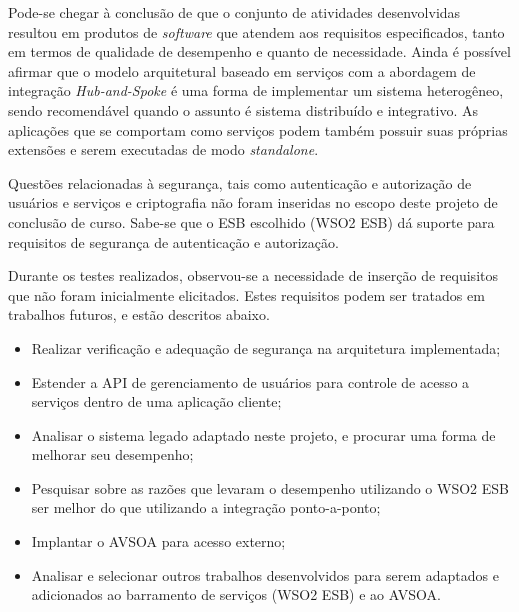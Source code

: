 Pode-se chegar à conclusão de que o conjunto de atividades desenvolvidas resultou em produtos de \textit{software} que atendem aos requisitos especificados, tanto em termos de qualidade de desempenho e quanto de necessidade. Ainda é possível afirmar que o modelo arquitetural baseado em serviços com a abordagem de integração \textit{Hub-and-Spoke} é uma forma de implementar um sistema heterogêneo, sendo recomendável quando o assunto é sistema distribuído e integrativo. As aplicações que se comportam como serviços podem também possuir suas próprias extensões e serem executadas de modo \textit{standalone}.

Questões relacionadas à segurança, tais como autenticação e autorização de usuários e serviços e criptografia não foram inseridas no escopo deste projeto de conclusão de curso. Sabe-se que o ESB escolhido (WSO2 ESB) dá suporte para requisitos de segurança de autenticação e autorização. 

Durante os testes realizados, observou-se a necessidade de inserção de requisitos que não foram inicialmente elicitados. Estes requisitos podem ser tratados em trabalhos futuros, e estão descritos abaixo.

\begin{itemize}
\item Realizar verificação e adequação de segurança na arquitetura implementada;
\item Estender a API de gerenciamento de usuários para controle de acesso a serviços dentro de uma aplicação cliente;
\item Analisar o sistema legado adaptado neste projeto, e procurar uma forma de melhorar seu desempenho;
\item Pesquisar sobre as razões que levaram o desempenho utilizando o WSO2 ESB ser melhor do que utilizando a integração ponto-a-ponto;
\item Implantar o AVSOA para acesso externo;
\item Analisar e selecionar outros trabalhos desenvolvidos para serem adaptados e adicionados ao barramento de serviços (WSO2 ESB) e ao AVSOA.
\end{itemize}


